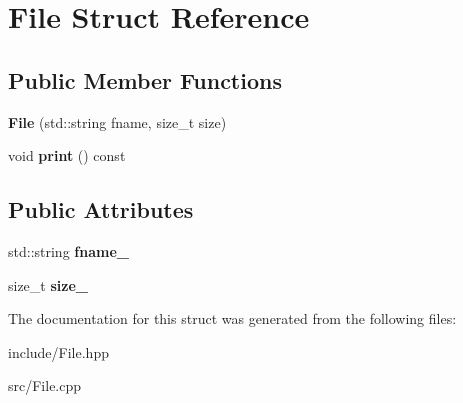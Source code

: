 \hypertarget{structFile}{}\section{File Struct Reference}
\label{structFile}
\subsection*{Public Member Functions}
\begin{DoxyCompactItemize}
\item 
{\bfseries File} (std\+::string fname, size\+\_\+t size)\hypertarget{structFile_ad0746cf10905ee35809f9e64452dc947}{}\label{structFile_ad0746cf10905ee35809f9e64452dc947}

\item 
void {\bfseries print} () const \hypertarget{structFile_a953519811424483b08848c889a7f0743}{}\label{structFile_a953519811424483b08848c889a7f0743}

\end{DoxyCompactItemize}
\subsection*{Public Attributes}
\begin{DoxyCompactItemize}
\item 
std\+::string {\bfseries fname\+\_\+}\hypertarget{structFile_ac40ef1df4d43c2dee0086ea073e5b1fd}{}\label{structFile_ac40ef1df4d43c2dee0086ea073e5b1fd}

\item 
size\+\_\+t {\bfseries size\+\_\+}\hypertarget{structFile_ac884c55c119bb40a06be3f81abaa79ab}{}\label{structFile_ac884c55c119bb40a06be3f81abaa79ab}

\end{DoxyCompactItemize}


The documentation for this struct was generated from the following files\+:\begin{DoxyCompactItemize}
\item 
include/File.\+hpp\item 
src/File.\+cpp\end{DoxyCompactItemize}
